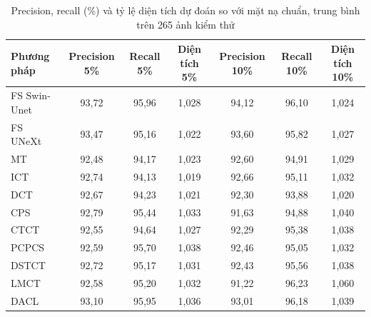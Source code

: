 \begin{table}[!t]
\caption{Precision, recall (\%) và tỷ lệ diện tích dự đoán so với mặt nạ chuẩn, trung bình trên 265 ảnh kiểm thử}
\label{tab:precrec}
\centering
\setlength{\tabcolsep}{6pt}
\begin{tabular}{|l|c|c|c|c|c|c|}
\hline
Phương pháp & Precision 5\% & Recall 5\% & Diện tích 5\% & Precision 10\% & Recall 10\% & Diện tích 10\% \\
\hline
FS Swin-Unet & 93{,}72 & 95{,}96 & 1{,}028 & 94{,}12 & 96{,}10 & 1{,}024 \\
FS UNeXt & 93{,}47 & 95{,}16 & 1{,}022 & 93{,}60 & 95{,}82 & 1{,}027 \\
\hline
MT & 92{,}48 & 94{,}17 & 1{,}023 & 92{,}60 & 94{,}91 & 1{,}029 \\
ICT & 92{,}74 & 94{,}13 & 1{,}019 & 92{,}66 & 95{,}11 & 1{,}032 \\
DCT & 92{,}67 & 94{,}23 & 1{,}021 & 92{,}30 & 93{,}88 & 1{,}020 \\
CPS & 92{,}79 & 95{,}44 & 1{,}033 & 91{,}63 & 94{,}88 & 1{,}040 \\
CTCT & 92{,}55 & 94{,}64 & 1{,}027 & 92{,}29 & 95{,}38 & 1{,}038 \\
PCPCS & 92{,}59 & 95{,}70 & 1{,}038 & 92{,}46 & 95{,}05 & 1{,}032 \\
DSTCT & 92{,}72 & 95{,}17 & 1{,}031 & 92{,}43 & 95{,}56 & 1{,}038 \\
LMCT & 92{,}58 & 95{,}20 & 1{,}032 & 91{,}22 & 96{,}23 & 1{,}060 \\
DACL & 93{,}10 & 95{,}95 & 1{,}036 & 93{,}01 & 96{,}18 & 1{,}039 \\
\hline
\end{tabular}
\end{table}
